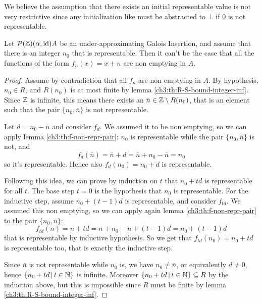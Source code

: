 We believe the assumption that there exists an initial representable value is not very restrictive since any initialization like  must be abstracted to $\bot$ if $0$ is not representable.

\begin{prop}\label{ch3:th:ne-sum-nonexsistence-inf}
	Let $\mathcal{P}(\mathbb{Z}) (\alpha, \text{id}) A$ be an under-approximating Galois Insertion, and assume that there is an integer $n_0$ that is representable. Then it can't be the case that all the functions of the form $f_n(x) = x + n$ are non emptying in $A$.
\end{prop}

\begin{proof}
	Assume by contradiction that all $f_n$ are non emptying in $A$.
	By hypothesis, $n_0 \in R$, and $R(n_0)$ is at most finite by lemma \ref{ch3:th:R-S-bound-integer-inf}. Since $\mathbb{Z}$ is infinite, this means there exists an $\bar{n} \in \mathbb{Z} \setminus R(n_0)$, that is an element such that the pair $\{ n_0, \bar{n} \}$ is not representable.

	Let $d = n_0 - \bar{n}$ and consider $f_d$. We assumed it to be non emptying, so we can apply lemma \ref{ch3:th:f-non-repr-pair}: $n_0$ is representable while the pair $\{ n_0, \bar{n} \}$ is not, and 
	\[
	f_d(\bar{n}) = \bar{n} + d = \bar{n} + n_0 - \bar{n} = n_0
	\]
	so it's representable. Hence also $f_d(n_0) = n_0 + d$ is representable.
	
	Following this idea, we can prove by induction on $t$ that $n_0 + t d$ is representable for all $t$. The base step $t = 0$ is the hypothesis that $n_0$ is representable.
	For the inductive step, assume $n_0 + (t - 1) d$ is representable, and consider $f_{t d}$. We assumed this non emptying, so we can apply again lemma \ref{ch3:th:f-non-repr-pair} to the pair $\{ n_0, \bar{n} \}$:
	\[
	f_{t d}(\bar{n}) = \bar{n} + t d = \bar{n} + n_0 - \bar{n} + (t - 1) d = n_0 + (t - 1) d
	\]
	that is representable by inductive hypothesis. So we get that $f_{t d}(n_0) = n_0 + t d$ is representable too, that is exactly the inductive step.

	Since $\bar{n}$ is not representable while $n_0$ is, we have $n_0 \neq \bar{n}$, or equivalently $d \neq 0$, hence $\{ n_0 + t d \,\vert\, t \in \mathbb{N} \}$ is infinite.
	Moreover $\{ n_0 + t d \,\vert\, t \in \mathbb{N} \} \subseteq R$ by the induction above, but this is impossible since $R$ must be finite by lemma \ref{ch3:th:R-S-bound-integer-inf}.
\end{proof}

